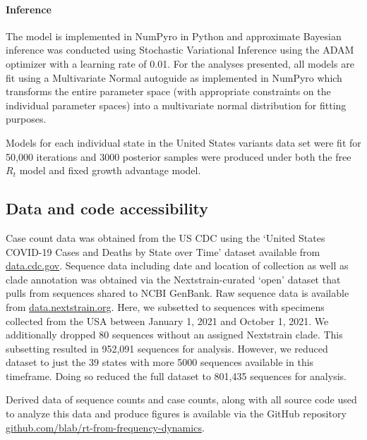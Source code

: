 \documentclass[11pt,oneside,letterpaper]{article}
\begin{document}
\paragraph{Inference}

The model is implemented in NumPyro \cite{phan2019composable} in Python and approximate Bayesian inference was conducted using Stochastic Variational Inference \cite{hoffman2013svi} using the ADAM optimizer \cite{kingma2017adam} with a learning rate of 0.01. For the analyses presented, all models are fit using a Multivariate Normal autoguide as implemented in NumPyro \cite{phan2019composable} which transforms the entire parameter space (with appropriate constraints on the individual parameter spaces) into a multivariate normal distribution for fitting purposes.

Models for each individual state in the United States variants data set were fit for 50,000 iterations and 3000 posterior samples were produced under both the free $R_{t}$ model and fixed growth advantage model.

\subsection*{Data and code accessibility}

Case count data was obtained from the US CDC using the `United States COVID-19 Cases and Deaths by State over Time' dataset available from \href{https://data.cdc.gov/Case-Surveillance/United-States-COVID-19-Cases-and-Deaths-by-State-o/9mfq-cb36}{data.cdc.gov}.
Sequence data including date and location of collection as well as clade annotation was obtained via the Nextstrain-curated `open' dataset \cite{Hadfield2018} that pulls from sequences shared to NCBI GenBank.
Raw sequence data is available from \href{https://docs.nextstrain.org/projects/ncov/en/latest/reference/remote_inputs.html}{data.nextstrain.org}.
Here, we subsetted to sequences with specimens collected from the USA between January 1, 2021 and October 1, 2021.
We additionally dropped 80 sequences without an assigned Nextstrain clade.
This subsetting resulted in 952,091 sequences for analysis.
However, we reduced dataset to just the 39 states with more 5000 sequences available in this timeframe.
Doing so reduced the full dataset to 801,435 sequences for analysis.

Derived data of sequence counts and case counts, along with all source code used to analyze this data and produce figures is available via the GitHub repository \href{https://github.com/blab/rt-from-frequency-dynamics/}{github.com/blab/rt-from-frequency-dynamics}.
\end{document}
